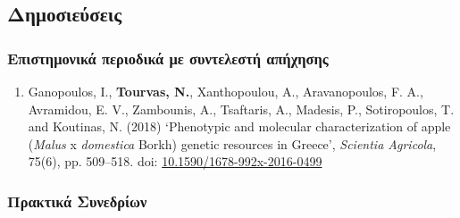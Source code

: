 \documentclass[12pt,]{scrartcl}
\begin{document}


\subsection{Δημοσιεύσεις}\label{publications}

\subsubsection{Επιστημονικά περιοδικά με συντελεστή απήχησης}\label{journals}
\vspace{-3mm}
\begin{enumerate}

\leftskip-0.07in

\item Ganopoulos, I., \textbf{Tourvas, N.}, Xanthopoulou, A., Aravanopoulos, F. A., Avramidou, E. V., Zambounis, A., Tsaftaris, A., Madesis, P., Sotiropoulos, T. and Koutinas, N. (2018) ‘Phenotypic and molecular characterization of apple (\textit{Malus} x \textit{domestica} Borkh) genetic resources in Greece’, \textit{Scientia Agricola}, 75(6), pp. 509–518. doi: \href{http://dx.doi.org/10.1590/1678-992x-2016-0499}{10.1590/1678-992x-2016-0499}


\end{enumerate}


\subsubsection{Πρακτικά Συνεδρίων}\label{conferences}
\end{document}
